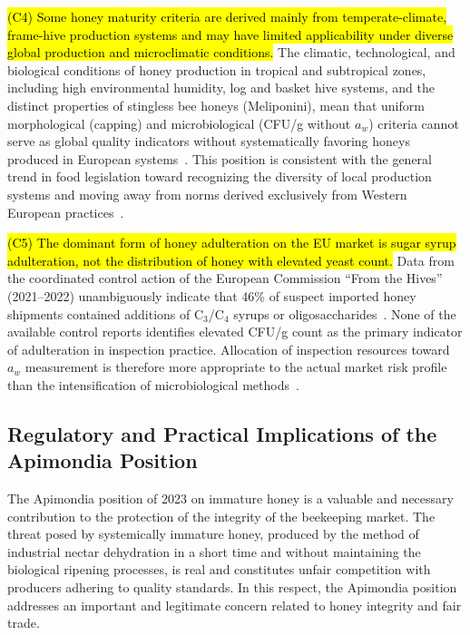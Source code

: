 \documentclass[foods,review,accept,pdftex,moreauthors]{Definitions/mdpi}
\begin{document}
{{\hl{(C4) Some honey maturity criteria are derived mainly from temperate-climate, frame-hive production systems and may have limited applicability under diverse global production and microclimatic conditions.}}
The climatic, technological, and biological conditions of honey
production in tropical and subtropical zones, including high
environmental humidity, log and basket hive systems, and the
distinct properties of stingless bee honeys (Meliponini), mean
that uniform morphological (capping) and microbiological (CFU/g
without $a_w$) criteria cannot serve as global quality indicators
without systematically favoring honeys produced in European
systems~\cite{tadele2025,stinglessyeastbrazil2021,sciendo2012}.
This position is consistent with the general trend in food
legislation toward recognizing the diversity of local production
systems and moving away from norms derived exclusively from
Western European practices~\cite{phiri2022}.

{\hl{(C5) The dominant form of honey adulteration on the EU market is sugar syrup adulteration, not the distribution of honey with elevated yeast count.}}
Data from the coordinated control action of the European Commission
``From the Hives'' (2021--2022) unambiguously indicate that 46\%
of suspect imported honey shipments contained additions of
C$_3$/C$_4$ syrups or oligosaccharides~\cite{eufromhives2021}.
None of the available control reports identifies elevated CFU/g
count as the primary indicator of adulteration in inspection
practice. Allocation of inspection resources toward $a_w$
measurement is therefore more appropriate to the actual market
risk profile than the intensification of microbiological
methods~\cite{schoder2026,eufromhives2021}.


\subsection{Regulatory and Practical Implications of the Apimondia Position}


The Apimondia position of 2023 on immature honey is a valuable and
necessary contribution to the protection of the integrity of the
beekeeping market. The threat posed by systemically immature honey,
produced by the method of industrial nectar dehydration in a short
time and without maintaining the biological ripening processes, is
real and constitutes unfair competition with producers adhering to
quality standards. In this respect, the Apimondia position addresses an important and legitimate concern related to honey integrity and fair trade.

}
\end{document}
